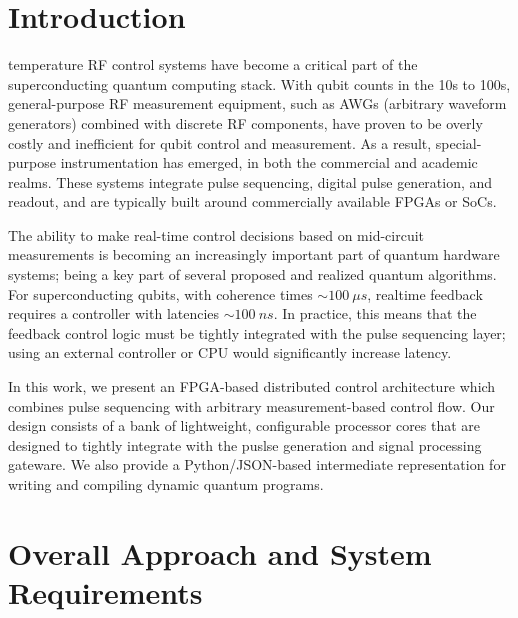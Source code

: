 \documentclass[journal]{IEEEtran}
\begin{document}
\section{Introduction}

 temperature RF control systems have become a critical part of the superconducting quantum computing stack.
With qubit counts in the 10s to 100s, general-purpose RF measurement equipment, such as AWGs (arbitrary waveform generators) combined with discrete RF components, have proven to be overly costly and inefficient for qubit control and measurement. As a result, special-purpose instrumentation has emerged, in both the commercial \cite{de2022qblox, mandelis2022focus, ella2022build} and academic \cite{park2022icarus, stefanazzi2022qick, tholen2022presto, xu2021qubic} realms. These systems integrate pulse sequencing, digital pulse generation, and readout, and are typically built around commercially available FPGAs or SoCs.

The ability to make real-time control decisions based on mid-circuit measurements is becoming an increasingly important part of quantum hardware systems; being a key part of several proposed \cite{deliyannis2022improving} and realized \cite{corcoles2021exploiting} quantum algorithms. For superconducting qubits, with coherence times $\sim 100\ \mu s$, realtime feedback requires a controller with latencies $\sim 100\ ns$. In practice, this means that the feedback control logic must be tightly integrated with the pulse sequencing layer; using an external controller or CPU would significantly increase latency. 

In this work, we present an FPGA-based distributed control architecture which combines pulse sequencing with arbitrary measurement-based control flow. Our design consists of a bank of lightweight, configurable processor cores that are designed to tightly integrate with the puslse generation and signal processing gateware. We also provide a Python/JSON-based intermediate representation for writing and compiling dynamic quantum programs.

 


\section{Overall Approach and System Requirements}
\end{document}
